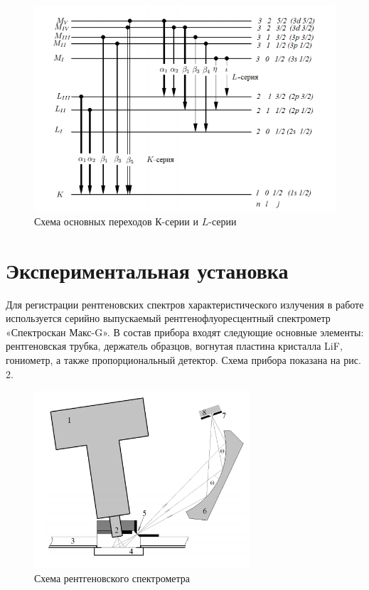 \documentclass[a4paper]{article}
\begin{document}
\begin{figure}[h]
\begin{center}
\includegraphics[width=15cm]{fig1.PNG}
\caption{Схема основных переходов $К$-серии и $L$-серии}
\label{ris:experimoriginal} %
\end{center}
\end{figure}

\section{Экспериментальная установка}

Для регистрации рентгеновских спектров характеристического излучения
в работе используется серийно выпускаемый рентгенофлуоресцентный
спектрометр «Спектроскан Макс-G». В состав прибора входят следующие
основные элементы: рентгеновская трубка, держатель образцов,
вогнутая пластина кристалла LiF, гониометр, а также пропорциональный
детектор. Схема прибора показана на рис. 2.

\begin{figure}[h]
\begin{center}
\includegraphics[width=8cm]{setup.PNG}
\caption{Схема рентгеновского спектрометра}
\label{ris:experimoriginal} %
\end{center}
\end{figure}
\end{document}
